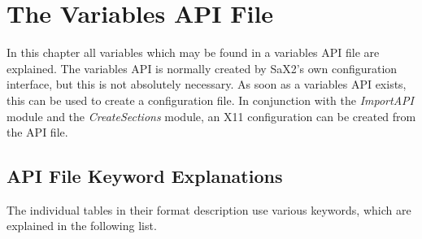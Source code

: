 \chapter{The Variables API File}
\label{cha:api}
\minitoc

In this chapter all variables which may be found in a variables 
API file are explained. The variables API is normally created by SaX2's own 
configuration interface, but this is not absolutely necessary. As soon as a 
variables API exists, this can be used to create a configuration file. 
In conjunction with the \textit{ImportAPI} module and the
\textit{CreateSections} module, an X11 configuration can be created from the 
API file. 

\section{API File Keyword Explanations}
The individual tables in their format description use various keywords, which
are explained in the following list. 

